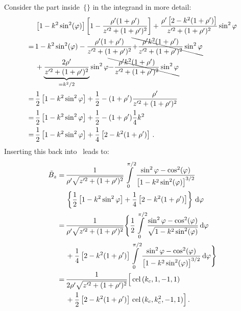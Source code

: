 Consider the part inside~$\{\}$ in the integrand in more detail:
\begin{align}
 ~&\,   \left[1 - k^2 \sin^2(\varphi)\right] \left[1 - \frac{\rho'(1 + \rho')}{z'^2 + (1 + \rho')^2} \right]
      + \frac{\rho'\left[2 - k^2(1+\rho')\right]}{z'^2 + (1 + \rho')^2} \sin^2{\varphi} \nonumber \\
 =&\, 1 - k^2 \sin^2(\varphi) - \frac{\rho'(1 + \rho')}{z'^2 + (1 + \rho')^2}
        \bcancel{+\frac{\rho' k^2 (1 + \rho')}{z'^2 + (1 + \rho')^2} \sin^2{\varphi}} \nonumber \\
 ~&\,   + \underbrace{\frac{2 \rho'}{z'^2 + (1 + \rho')^2}}_{=k^2/2} \sin^2{\varphi}
        \bcancel{-\frac{\rho' k^2 (1+\rho')}{z'^2 + (1 + \rho')^2} \sin^2{\varphi}} \nonumber \\
 =&\, \frac{1}{2} \left[1 - k^2 \sin^2{\varphi} \right] + \frac{1}{2} - (1+\rho') \frac{\rho'}{z'^2 + (1 + \rho')^2} \nonumber \\
 =&\, \frac{1}{2} \left[1 - k^2 \sin^2{\varphi} \right] + \frac{1}{2} - (1+\rho') \frac{1}{4} k^2 \nonumber \\
 =&\, \frac{1}{2} \left[1 - k^2 \sin^2{\varphi} \right] + \frac{1}{4} \left[2 - k^2 (1+\rho') \right] \, .
\end{align}
Inserting this back into~ leads to:
\begin{align}
 \tilde{B}_z
 =&\, \frac{1}{\rho' \sqrt{z'^2 + (1 + \rho')^2}}
      \int\limits_0^{\pi/2}
        \frac{\sin^2{\varphi} - \cos^2(\varphi)}{\left[1 - k^2 \sin^2(\varphi)\right]^{3/2}} \nonumber \\
 ~&\, \left\{ \frac{1}{2} \left[1 - k^2 \sin^2{\varphi} \right] + \frac{1}{4} \left[2 - k^2 (1+\rho') \right] \right\} \,\mathrm{d}\varphi \nonumber \\
 =&\, \frac{1}{\rho' \sqrt{z'^2 + (1 + \rho')^2}} \Biggl\{
          \frac{1}{2} \int\limits_0^{\pi/2} \frac{\sin^2{\varphi} - \cos^2(\varphi)}{\sqrt{1 - k^2 \sin^2(\varphi)}} \,\mathrm{d}\varphi \nonumber \\
 ~&\, + \frac{1}{4} \left[2 - k^2 (1+\rho') \right] \int\limits_0^{\pi/2}
        \frac{\sin^2{\varphi} - \cos^2(\varphi)}{\left[1 - k^2 \sin^2(\varphi)\right]^{3/2}} \,\mathrm{d}\varphi \Biggr\} \nonumber \\
 =&\, \frac{1}{2 \rho' \sqrt{z'^2 + (1 + \rho')^2}} \Bigl[ \,\textrm{cel}\,(k_c, 1, -1, 1) \nonumber \\
 ~&\, + \frac{1}{2} \left[2 - k^2 (1+\rho') \right] \,\textrm{cel}\,(k_c, k_c^2, -1, 1) \Bigr] \, . \label{eqn:cwl_B_z_teal}
\end{align}

